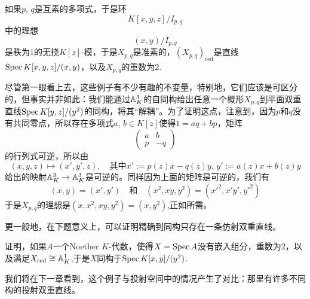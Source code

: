
\begin{exe}
如果$p$, $q$是互素的多项式，于是环
\[
	K[x,y,z]/I_{p,q}
\]
中的理想
\[
	(x,y)/I_{p,q}
\]
是秩为$1$的无挠$K[z]$\hyp 模，于是$X_{p,q}$是准素的，$(X_{p,q})_{\text{red}}$是直线$\operatorname{Spec} K[x,y,z]/(x,y)$，以及$X_{p,q}$的重数为$2$.
\end{exe}

尽管第一眼看上去，这些例子有不少有趣的不变量，特别地，它们应该是可区分的，但事实并非如此：我们能通过$\mathbb{A}_{K}^3$的自同构给出任意一个概形$X_{p,q}$到平面双重直线$\operatorname{Spec} K[y,z]/(y^2)$的同构，将其“解耦”。为了证明这点，注意到，因为$p$和$q$没有共同零点，所以存在多项式$a$, $b\in K[z]$使得$1=aq+bp$，矩阵
\[
	\begin{pmatrix}
	a&b\\
	p&-q
	\end{pmatrix}
\]
的行列式可逆，所以由
\[
	(x,y,z)\mapsto (x',y',z),\quad \text{其中$x':=p(z)x-q(z)y$, $y':=a(z)x+b(z)y$}
\]
给出的映射$\mathbb{A}_K^3\to \mathbb{A}_K^3$是可逆的。同样因为上面的矩阵是可逆的，我们有
\[
	(x,y)=(x',y')\quad\text{和}\quad (x^2,xy,y^2)=({x'}^2,x'y',{y'}^2)
\]
于是$X_{p,q}$的理想是$(x,x^2,xy,y^2)=(x,y^2)$,正如所需。

更一般地，在下题意义上，可以证明精确到同构只存在一条仿射双重直线。

\begin{exe}
	证明，如果$A$一个Noether $K$\hyp 代数，使得$X=\operatorname{Spec} A$没有嵌入组分，重数为$2$，以及满足$X_{\text{red}}\cong \mathbb{A}_K^1$,于是$X$同构于$\operatorname{Spec} K[x,y]/(y^2)$.
\end{exe}

我们将在下一章看到，这个例子与投射空间中的情况产生了对比：那里有许多不同构的投射双重直线。